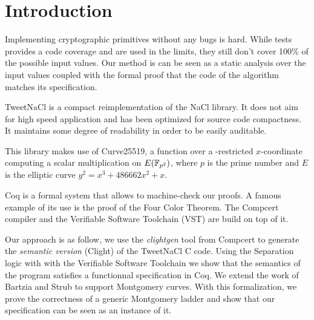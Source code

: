 \section{Introduction}

Implementing cryptographic primitives without any bugs is hard.
While tests provides a code coverage and are used in the limits,
they still don't cover 100\% of the possible input values.
Our method is can be seen as a static analysis over the input values coupled
with the formal proof that the code of the algorithm matches its specification.

TweetNaCl\cite{BGJ+15} is a compact reimplementation of the
NaCl\cite{BLS12} library. It does not aim for high speed
application and has been optimized for source code compactness.
It maintains some degree of readability in order to be easily auditable.

This library makes use of Curve25519\cite{Ber06}, a function over a -restricted
$x$-coordinate computing a scalar multiplication on $E(\mathbb{F}_{p^2})$, where $p$ is the prime number \p
and $E$ is the elliptic curve $y^2 = x^3 + 486662 x^2 + x$.

Coq is a formal system that allows to machine-check our proofs.
A famous example of its use is the proof of the Four Color Theorem.
The Compcert\cite{Leroy-backend} compiler and the Verifiable Software Toolchain (VST)\cite{2012-Appel} are build
on top of it.

Our approach is as follow, we use the \textit{clightgen} tool from Compcert to
generate the \textit{semantic version} (Clight\cite{Blazy-Leroy-Clight-09}) of
the TweetNaCl C code.
Using the Separation logic\cite{1969-Hoare,Reynolds02separationlogic}
with with the Verifiable Software Toolchain we show that the semantics of the
program satisfies a functionnal specification in Coq.
We extend the work of Bartzia and Strub \cite{DBLP:conf/itp/BartziaS14} to support Montgomery curves.
With this formalization, we prove the correctness of a generic Montgomery ladder
and show that our specification can be seen as an instance of it.
